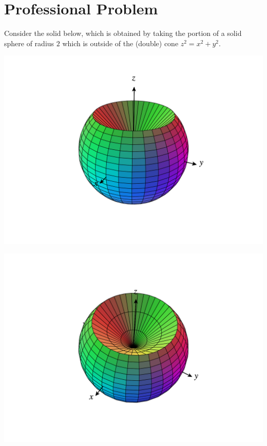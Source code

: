 \documentclass{ximera}
\begin{document}
\section*{Professional Problem}

\begin{problem}
Consider the solid below, which is obtained by taking the portion of a solid sphere of radius $2$ which is outside of the (double) cone $z^2 = x^2+y^2$.

\begin{image}
\includegraphics[width=\textwidth]{CalcPlot3D-pp_1}
\end{image}
\begin{image}
\includegraphics[width=\textwidth]{CalcPlot3D-pp_3}
\end{image}

\end{problem}
\end{document}
